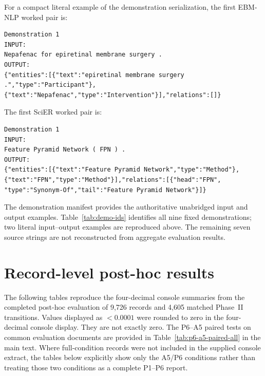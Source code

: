 \documentclass[fleqn,10pt]{wlscirep-authoryear}
\begin{document}
For a compact literal example of the demonstration serialization, the first
EBM-NLP worked pair is:
\begin{lstlisting}[style=promptstyle]
Demonstration 1
INPUT:
Nepafenac for epiretinal membrane surgery .
OUTPUT:
{"entities":[{"text":"epiretinal membrane surgery .","type":"Participant"},
{"text":"Nepafenac","type":"Intervention"}],"relations":[]}
\end{lstlisting}
The first SciER worked pair is:
\begin{lstlisting}[style=promptstyle]
Demonstration 1
INPUT:
Feature Pyramid Network ( FPN ) .
OUTPUT:
{"entities":[{"text":"Feature Pyramid Network","type":"Method"},
{"text":"FPN","type":"Method"}],"relations":[{"head":"FPN",
"type":"Synonym-Of","tail":"Feature Pyramid Network"}]}
\end{lstlisting}
The demonstration manifest provides the authoritative unabridged input and
output examples. Table~\ref{tab:demo-ids} identifies all nine fixed
demonstrations; two literal input--output examples are reproduced above.
The remaining seven source strings are not reconstructed from aggregate
evaluation results.

\section{Record-level post-hoc results}
\label{app:posthoc-results}
The following tables reproduce the four-decimal console summaries from the
completed post-hoc evaluation of 9,726 records and 4,605 matched
Phase~II transitions. Values displayed as $<0.0001$ were rounded to zero
in the four-decimal console display. They are not exactly zero. The P6--A5
paired tests on common evaluation documents are provided in
Table~\ref{tab:p6-a5-paired-all} in the main text. Where full-condition
records were not included in the supplied console extract, the tables
below explicitly show only the A5/P6 conditions rather than treating
those two conditions as a complete P1--P6 report.
\end{document}
